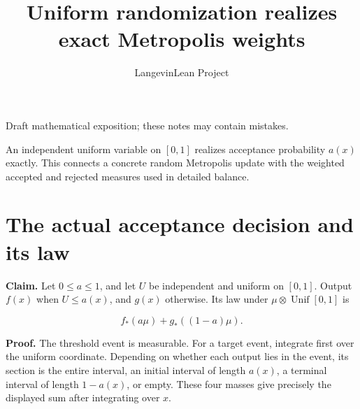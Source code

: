 \documentclass[11pt,a4paper]{article}
\title{\texorpdfstring{Uniform randomization realizes exact Metropolis weights}{Uniform randomization realizes exact Metropolis weights}}
\author{LangevinLean Project}
\date{}
\begin{document}
\maketitle
Draft mathematical exposition; these notes may contain mistakes.


An independent uniform variable on \([0,1]\) realizes acceptance probability \(a(x)\) exactly. This connects a concrete random Metropolis update with the weighted accepted and rejected measures used in detailed balance.


\section{\texorpdfstring{The actual acceptance decision and its law}{The actual acceptance decision and its law}}


\textbf{Claim.} Let \(0\le a\le1\), and let \(U\) be independent and uniform on \([0,1]\). Output \(f(x)\) when \(U\le a(x)\), and \(g(x)\) otherwise. Its law under \(\mu\otimes\operatorname{Unif}[0,1]\) is

\[f_*(a\mu)+g_*((1-a)\mu).\]

\textbf{Proof.} The threshold event is measurable. For a target event, integrate first over the uniform coordinate. Depending on whether each output lies in the event, its section is the entire interval, an initial interval of length \(a(x)\), a terminal interval of length \(1-a(x)\), or empty. These four masses give precisely the displayed sum after integrating over \(x\).
\end{document}
